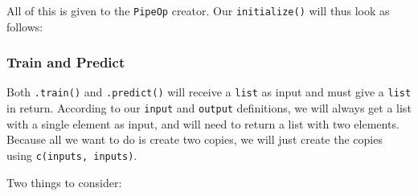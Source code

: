 \documentclass[
]{scrbook}
\newenvironment{Shaded}{\begin{snugshade}}{\end{snugshade}}
\newcommand{\AttributeTok}[1]{\textcolor[rgb]{0.77,0.63,0.00}{#1}}
\newcommand{\CommentTok}[1]{\textcolor[rgb]{0.56,0.35,0.01}{\textit{#1}}}
\newcommand{\ControlFlowTok}[1]{\textcolor[rgb]{0.13,0.29,0.53}{\textbf{#1}}}
\newcommand{\FunctionTok}[1]{\textcolor[rgb]{0.00,0.00,0.00}{#1}}
\newcommand{\NormalTok}[1]{#1}
\newcommand{\OtherTok}[1]{\textcolor[rgb]{0.56,0.35,0.01}{#1}}
\newcommand{\SpecialCharTok}[1]{\textcolor[rgb]{0.00,0.00,0.00}{#1}}
\newcommand{\StringTok}[1]{\textcolor[rgb]{0.31,0.60,0.02}{#1}}
\renewenvironment{Shaded} {\begin{snugshade}\small} {\end{snugshade}}
\begin{document}
All of this is given to the \texttt{PipeOp} creator. Our \texttt{initialize()} will thus look as follows:

\begin{Shaded}
\end{Shaded}

\hypertarget{train-and-predict}{%
\subsubsection{Train and Predict}\label{train-and-predict}}

Both \texttt{.train()} and \texttt{.predict()} will receive a \texttt{list} as input and must give a \texttt{list} in return.
According to our \texttt{input} and \texttt{output} definitions, we will always get a list with a single element as input, and will need to return a list with two elements. Because all we want to do is create two copies, we will just create the copies using \texttt{c(inputs,\ inputs)}.

Two things to consider:
\end{document}

